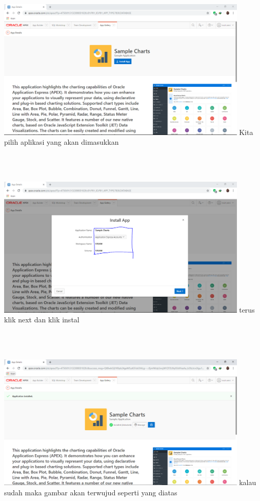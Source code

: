 \documentclass[12pt, times news roman, a4paper] {article}
\begin{document}
\begin{minipage}{\linewidth}
	\centering
	\includegraphics[width=12cm]{Gambar2.png} 
	 {Kita pilih aplikasi yang akan dimasukkan}
\end{minipage}\\
\\
\begin{minipage}{\linewidth}
	\centering
	\includegraphics[width=12cm]{Gambar3.png} 
	 {terus klik next dan klik instal}
\end{minipage}\\
\\
\begin{minipage}{\linewidth}
	\centering
	\includegraphics[width=12cm]{Gambar4.png} 
	 {kalau sudah maka gambar akan terwujud seperti yang diatas}
\end{minipage}\\
\end{document}
